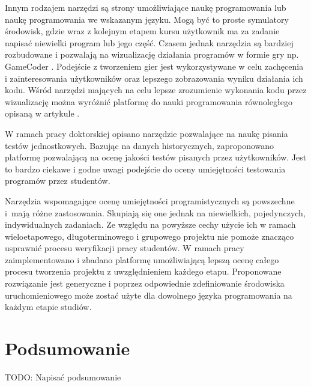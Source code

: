 Innym rodzajem narzędzi są strony umożliwiające naukę programowania lub naukę programowania we wskazanym języku. 
Mogą być to proste symulatory środowisk, gdzie wraz z kolejnym etapem kursu użytkownik ma za zadanie napisać niewielki program lub jego część.
Czasem jednak narzędzia są bardziej rozbudowane i pozwalają na wizualizację działania programów w formie gry np. GameCoder \cite{game-coder}.
Podejście z tworzeniem gier jest wykorzystywane w celu zachęcenia i zainteresowania użytkowników oraz lepszego zobrazowania wyniku działania ich kodu.
Wśród narzędzi mających na celu lepsze zrozumienie wykonania kodu przez wizualizację można wyróżnić platformę do nauki programowania równoległego opisaną w artykule \cite{pharaller-platform}.

W ramach pracy doktorskiej \cite{teach-testing-thesis} opisano narzędzie pozwalające na naukę pisania testów jednostkowych.
Bazując na danych historycznych, zaproponowano platformę pozwalającą na ocenę jakości testów pisanych przez użytkowników.
Jest to bardzo ciekawe i godne uwagi podejście do oceny umiejętności testowania programów przez studentów.

Narzędzia wspomagające ocenę umiejętności programistycznych są powszechne i~mają różne zastosowania.
Skupiają się one jednak na niewielkich, pojedynczych, indywidualnych zadaniach.
Ze względu na powyższe cechy użycie ich w ramach wieloetapowego, długoterminowego i grupowego projektu nie pomoże znacząco usprawnić procesu weryfikacji pracy studentów.
W ramach pracy zaimplementowano i zbadano platformę umożliwiającą lepszą ocenę całego procesu tworzenia projektu z uwzględnieniem każdego etapu.
Proponowane rozwiązanie jest generyczne i poprzez odpowiednie zdefiniowanie środowiska uruchomieniowego może zostać użyte dla dowolnego języka programowania na każdym etapie studiów.

\vfill


\section{Podsumowanie}

TODO: Napisać podsumowanie